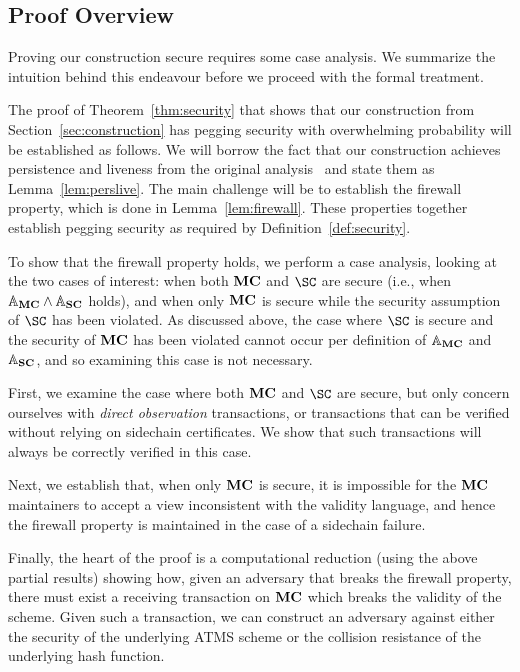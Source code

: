 \subsection{Proof Overview}

Proving our construction secure requires some case analysis. We summarize the
intuition behind this endeavour before we proceed with the formal treatment.

The proof of Theorem~\ref{thm:security} that shows that
our construction from Section~\ref{sec:construction} has pegging security with overwhelming probability will be
established as follows. We will borrow the fact that our construction achieves
persistence and liveness
from the original analysis~\cite{C:KRDO17} and state
them as Lemma~\ref{lem:perslive}. The main challenge will
be to establish the firewall property, which is done in
Lemma~\ref{lem:firewall}. These properties together establish pegging
security as required by Definition~\ref{def:security}.

To show that the firewall property holds, we
perform a case analysis, looking at
the two cases of interest: when both $\mathbf{MC}$ and
$\SC$ are secure (i.e., when $\mathbb{A}_{\mathbf{MC}}\land\mathbb{A}_{\mathbf{SC}}$ holds), and when only $\mathbf{MC}$ is secure while the security assumption of
$\SC$ has been violated.
As discussed above, the case where $\SC$ is secure and
the security of $\mathbf{MC}$ has been violated cannot occur per definition of
$\mathbb{A}_{\mathbf{MC}}$ and $\mathbb{A}_{\mathbf{SC}}$, and so examining this
case is not necessary.

First, we examine the case where both $\mathbf{MC}$ and $\SC$ are secure, but only
concern ourselves with \emph{direct observation} transactions, or transactions
that can be verified without relying on sidechain certificates.
We show that such
transactions will always be correctly verified
in this case.

Next, we establish that, when only $\mathbf{MC}$ is secure, it is impossible for the
$\mathbf{MC}$ maintainers to accept a view inconsistent with the validity language, and
hence the firewall property is maintained in the case of a sidechain failure.

Finally, the heart of the proof is a computational reduction (using the above
partial results) showing how, given
an adversary that breaks the firewall property,
there must exist a receiving transaction on $\mathbf{MC}$
which breaks the validity of the scheme. Given such a transaction, we can
construct an adversary against either the security of the underlying ATMS scheme or the
collision resistance of the underlying hash function.

